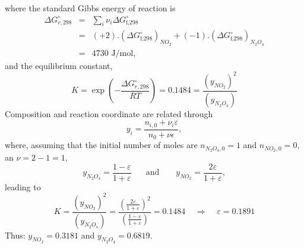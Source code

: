 \documentclass[calculator,allquestions,datasheet,mock,Pens]{exam_newMarcus2}
\newcommand{\frc}{\displaystyle\frac}
\begin{document}
\begin{question}
\begin{enumerate}[a)]
{\begin{enumerate}[A.]
\begin{displaymath}
                    \end{displaymath}
         where the standard Gibbs energy of reaction is~
         \begin{eqnarray}
           \Delta G^{\circ}_{r,298} &=& \sum\limits_{i}\nu_{i}\Delta G^{\circ}_{\text{f,298}} \nonumber \\
                             &=& (+2).\left(\Delta G^{\circ}_{\text{f,298}}\right)_{NO_{2}} + (-1).\left(\Delta G^{\circ}_{\text{f,298}}\right)_{N_{2}O_{4}} \nonumber \\ 
                             &=& 4730 \text{ J/mol}, \nonumber
         \end{eqnarray}
         and the equilibrium constant,~
         \begin{displaymath}
             K = \exp\left(-\frc{\Delta G^{\circ}_{r,298}}{RT}\right) = 0.1484 = \frac{\left(y_{NO_{2}}\right)^{2}}{\left(y_{N_{2}O_{4}}\right)}
         \end{displaymath}
         Composition and reaction coordinate are related through
         \begin{displaymath}
            y_{i} = \frc{n_{i,0} + \nu_{i}\varepsilon}{n_{0}+\nu\epsilon},
         \end{displaymath}
         where, assuming that the initial number of moles are $n_{N_{2}O_{4},0}=1$ and $n_{NO_{2},0}=0$, an $\nu= 2-1 = 1$,
         \begin{displaymath}
            y_{N_{2}O_{4}} = \frc{1-\varepsilon}{1+\varepsilon}\;\;\;\;\;\text{ and }\;\;\;\;\;\; y_{NO_{2}} = \frc{2\varepsilon}{1+\varepsilon},
         \end{displaymath}
         leading to
         \begin{displaymath}
             K = \frac{\left(y_{NO_{2}}\right)^{2}}{\left(y_{N_{2}O_{4}}\right)} = \frc{\left(\frc{2\varepsilon}{1+\varepsilon}\right)^{2}}{\left(\frc{1-\varepsilon}{1+\varepsilon}\right)} = 0.1484 \;\;\;\;\Longrightarrow\;\;\;\; \varepsilon = 0.1891
         \end{displaymath}
         Thus: $y_{NO_{2}} = 0.3181$ and $y_{N_{2}O_{4}} = 0.6819$.~


\end{enumerate}}
\end{enumerate}
\end{question}
\end{document}
